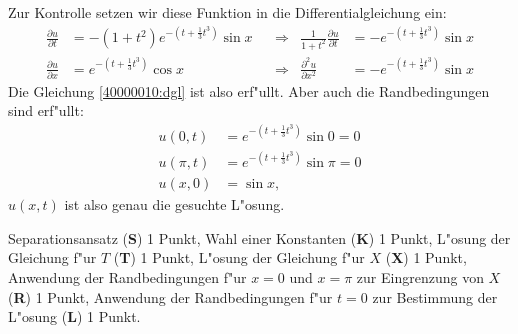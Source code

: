 \begin{diskussion}
Zur Kontrolle setzen wir diese Funktion in die Differentialgleichung
ein:
\begin{align*}
\frac{\partial u}{\partial t}&=
-(1+t^2)
e^{-(t+\frac13t^3)}
\sin x
&&\Rightarrow&
\frac1{1+t^2}\frac{\partial u}{\partial t}&=
-e^{-(t+\frac13t^3)}
\sin x
\\
\frac{\partial u}{\partial x}&=
e^{-(t+\frac13t^3)}
\cos x
&&\Rightarrow&
\frac{\partial^2 u}{\partial x^2}&=
-e^{-(t+\frac13t^3)}
\sin x
\end{align*}
Die Gleichung \eqref{40000010:dgl} ist also erf"ullt.
Aber auch die Randbedingungen sind erf"ullt:
\begin{align*}
u(0,t)&=e^{-(t+\frac13t^3)}\sin 0=0\\
u(\pi,t)&=e^{-(t+\frac13t^3)}\sin\pi=0\\
u(x,0)&=\sin x,
\end{align*}
$u(x,t)$ ist also genau die gesuchte L"osung.
\end{diskussion}

\begin{bewertung}
Separationsansatz ({\bf S}) 1 Punkt,
Wahl einer Konstanten ({\bf K}) 1 Punkt,
L"osung der Gleichung f"ur $T$ ({\bf T}) 1 Punkt,
L"osung der Gleichung f"ur $X$ ({\bf X}) 1 Punkt,
Anwendung der Randbedingungen f"ur $x=0$ und $x=\pi$
zur Eingrenzung von $X$ ({\bf R}) 1 Punkt,
Anwendung der Randbedingungen f"ur $t=0$ zur Bestimmung
der L"osung ({\bf L}) 1 Punkt.
\end{bewertung}

